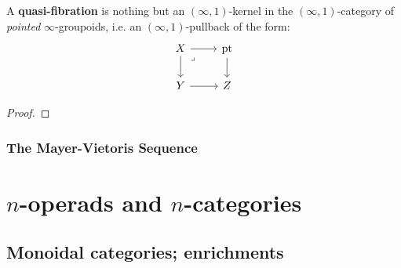             \begin{definition} \label{def: quasi_fibration}
                A \textbf{quasi-fibration} is nothing but an $(\infty, 1)$-kernel in the $(\infty, 1)$-category of \textit{pointed} $\infty$-groupoids, i.e. an $(\infty, 1)$-pullback of the form:
                    $$
                        \begin{tikzcd}
                        	X & \pt \\
                        	Y & Z
                        	\arrow[from=1-1, to=2-1]
                        	\arrow[from=2-1, to=2-2]
                        	\arrow[from=1-2, to=2-2]
                        	\arrow[from=1-1, to=1-2]
                        	\arrow["\lrcorner"{anchor=center, pos=0.125}, draw=none, from=1-1, to=2-2]
                        \end{tikzcd}
                    $$
            \end{definition}
            
            \begin{theorem} \label{theorem: induced_long_exact_sequence_of_homotopy_groups}
                
            \end{theorem}
                \begin{proof}
                    
                \end{proof}
        
        \subsubsection{The Mayer-Vietoris Sequence}

\section{\texorpdfstring{$n$}{}-operads and \texorpdfstring{$n$}{}-categories}
    \subsection{Monoidal categories; enrichments}
